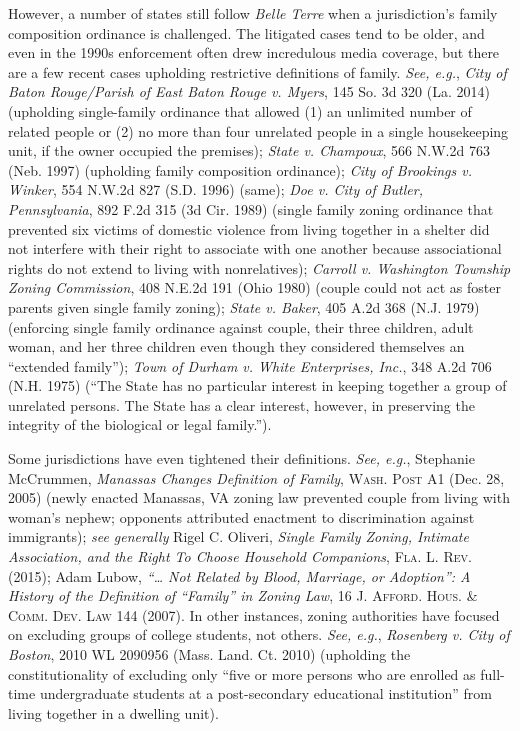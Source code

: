 However, a number of states still follow \textit{Belle Terre} when a
jurisdiction's family composition ordinance is challenged. The litigated cases
tend to be older, and even in the 1990s enforcement often drew incredulous media
coverage, but there are a few recent cases upholding restrictive definitions of
family. \textit{See, e.g.}, \emph{City of Baton Rouge/Parish of East Baton Rouge
v. Myers}, 145 So. 3d 320 (La. 2014) (upholding single-family ordinance that
allowed (1) an unlimited number of related people or (2) no more than four
unrelated people in a single housekeeping unit, if the owner occupied the
premises); \emph{State v. Champoux}, 566 N.W.2d 763 (Neb. 1997) (upholding
family composition ordinance); \emph{City of Brookings v. Winker}, 554 N.W.2d
827 (S.D. 1996) (same); \emph{Doe v. City of Butler, Pennsylvania}, 892 F.2d 315
(3d Cir. 1989) (single family zoning ordinance that prevented six victims of
domestic violence from living together in a shelter did not interfere with their
right to associate with one another because associational rights do not extend
to living with nonrelatives); \emph{Carroll v. Washington Township Zoning
Commission}, 408 N.E.2d 191 (Ohio 1980) (couple could not act as foster parents
given single family zoning); \emph{State v. Baker}, 405 A.2d 368 (N.J. 1979)
(enforcing single family ordinance against couple, their three children, adult
woman, and her three children even though they considered themselves an
``extended family''); \emph{Town of Durham v. White Enterprises, Inc.}, 348 A.2d
706 (N.H. 1975) (``The State has no particular interest in keeping together a
group of unrelated persons. The State has a clear interest, however, in
preserving the integrity of the biological or legal family.''). 

Some jurisdictions have even tightened their definitions. \textit{See, e.g.},
Stephanie McCrummen, \emph{Manassas Changes Definition of Family}, \textsc{Wash.
Post} A1 (Dec. 28, 2005) (newly enacted Manassas, VA zoning law prevented couple
from living with woman's nephew; opponents attributed enactment to
discrimination against immigrants); \textit{see generally} Rigel C. Oliveri,
\emph{Single Family Zoning, Intimate Association, and the Right To Choose
Household Companions}, \textsc{Fla. L. Rev.} (2015); Adam Lubow, \emph{``\ldots
Not Related by Blood, Marriage, or Adoption'': A History of the Definition of
``Family'' in Zoning Law}, 16 \textsc{J. Afford. Hous. \& Comm. Dev. Law} 144
(2007). In other instances, zoning authorities have focused on excluding groups
of college students, not others. \textit{See, e.g.}, \emph{Rosenberg v. City of
Boston}, 2010 WL 2090956 (Mass. Land. Ct. 2010) (upholding the constitutionality
of excluding only ``five or more persons who are enrolled as full-time
undergraduate students at a post-secondary educational institution'' from living
together in a dwelling unit).

